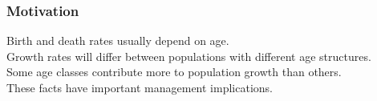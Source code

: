 \documentclass[color=usenames,dvipsnames]{beamer}\usepackage[]{graphicx}\usepackage[]{color}
\begin{document}
\begin{frame}
  \frametitle{Motivation}
  \large
  Birth and death rates usually depend on age. \\
  \pause
  \vfill
  Growth rates will differ between populations with
  different age structures. \\
  \pause
  \vfill
  Some age classes contribute more to population growth than others. \\
  \pause
  \vfill
  These facts have important management implications. \\
\end{frame}
\end{document}
